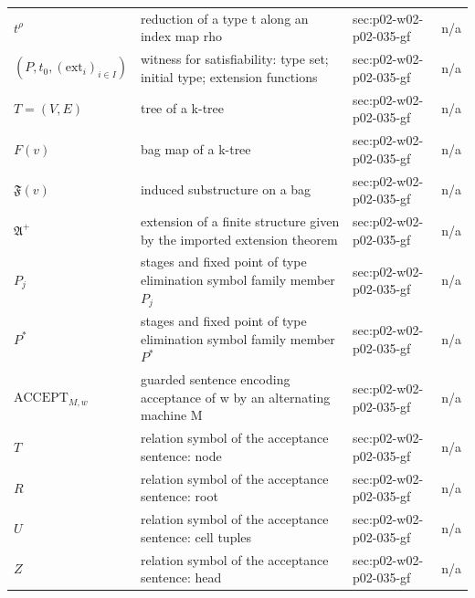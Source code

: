 \begin{longtable}{@{}p{}p{}p{}p{}@{}}
\(t^\rho\) & reduction of a type t along an index map rho & sec:\allowbreak{}p02-\allowbreak{}w02-\allowbreak{}p02-\allowbreak{}035-\allowbreak{}gf & n/a \\
\((P,\allowbreak t_0,\allowbreak (\mathrm{ext}_i)_{i\in I})\) & witness for satisfiability: type set; initial type; extension functions & sec:\allowbreak{}p02-\allowbreak{}w02-\allowbreak{}p02-\allowbreak{}035-\allowbreak{}gf & n/a \\
\(T=(V,\allowbreak E)\) & tree of a k-tree & sec:\allowbreak{}p02-\allowbreak{}w02-\allowbreak{}p02-\allowbreak{}035-\allowbreak{}gf & n/a \\
\(F(v)\) & bag map of a k-tree & sec:\allowbreak{}p02-\allowbreak{}w02-\allowbreak{}p02-\allowbreak{}035-\allowbreak{}gf & n/a \\
\(\mathfrak F(v)\) & induced substructure on a bag & sec:\allowbreak{}p02-\allowbreak{}w02-\allowbreak{}p02-\allowbreak{}035-\allowbreak{}gf & n/a \\
\(\mathfrak A^{+}\) & extension of a finite structure given by the imported extension theorem & sec:\allowbreak{}p02-\allowbreak{}w02-\allowbreak{}p02-\allowbreak{}035-\allowbreak{}gf & n/a \\
\(P_j\) & stages and fixed point of type elimination symbol family member \(P_j\) & sec:\allowbreak{}p02-\allowbreak{}w02-\allowbreak{}p02-\allowbreak{}035-\allowbreak{}gf & n/a \\
\(P^{*}\) & stages and fixed point of type elimination symbol family member \(P^{*}\) & sec:\allowbreak{}p02-\allowbreak{}w02-\allowbreak{}p02-\allowbreak{}035-\allowbreak{}gf & n/a \\
\(\mathrm{ACCEPT}_{M,w}\) & guarded sentence encoding acceptance of w by an alternating machine M & sec:\allowbreak{}p02-\allowbreak{}w02-\allowbreak{}p02-\allowbreak{}035-\allowbreak{}gf & n/a \\
\(T\) & relation symbol of the acceptance sentence: node & sec:\allowbreak{}p02-\allowbreak{}w02-\allowbreak{}p02-\allowbreak{}035-\allowbreak{}gf & n/a \\
\(R\) & relation symbol of the acceptance sentence: root & sec:\allowbreak{}p02-\allowbreak{}w02-\allowbreak{}p02-\allowbreak{}035-\allowbreak{}gf & n/a \\
\(U\) & relation symbol of the acceptance sentence: cell tuples & sec:\allowbreak{}p02-\allowbreak{}w02-\allowbreak{}p02-\allowbreak{}035-\allowbreak{}gf & n/a \\
\(Z\) & relation symbol of the acceptance sentence: head & sec:\allowbreak{}p02-\allowbreak{}w02-\allowbreak{}p02-\allowbreak{}035-\allowbreak{}gf & n/a \\

\end{longtable}
